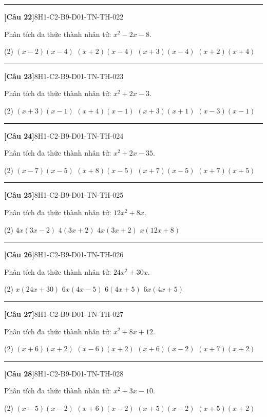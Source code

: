 \documentclass[12pt,a4paper]{article}
\newif\ifloigiai
\newenvironment{cauhoi}[2]{%
  \par\medskip\noindent\rule{\textwidth}{0.4pt}\par\nopagebreak
  \noindent\textbf{[#1]}\hfill{\scriptsize\ttfamily #2}\par\nopagebreak\smallskip}{\par}
\newcommand{\dapan}[1]{\ifloigiai\par\smallskip\noindent\textit{Đáp án:} \textbf{#1}\par\fi}
\begin{document}
\begin{cauhoi}{Câu 22}{8H1-C2-B9-D01-TN-TH-022}
Phân tích đa thức thành nhân tử: $x^{2} - 2x - 8$.
\begin{tasks}(2)
\task $(x - 2)(x - 4)$
\task $(x + 2)(x - 4)$
\task $(x + 3)(x - 4)$
\task $(x + 2)(x + 4)$
\end{tasks}
\dapan{B}
\end{cauhoi}
\begin{cauhoi}{Câu 23}{8H1-C2-B9-D01-TN-TH-023}
Phân tích đa thức thành nhân tử: $x^{2} + 2x - 3$.
\begin{tasks}(2)
\task $(x + 3)(x - 1)$
\task $(x + 4)(x - 1)$
\task $(x + 3)(x + 1)$
\task $(x - 3)(x - 1)$
\end{tasks}
\dapan{A}
\end{cauhoi}
\begin{cauhoi}{Câu 24}{8H1-C2-B9-D01-TN-TH-024}
Phân tích đa thức thành nhân tử: $x^{2} + 2x - 35$.
\begin{tasks}(2)
\task $(x - 7)(x - 5)$
\task $(x + 8)(x - 5)$
\task $(x + 7)(x - 5)$
\task $(x + 7)(x + 5)$
\end{tasks}
\dapan{C}
\end{cauhoi}
\begin{cauhoi}{Câu 25}{8H1-C2-B9-D01-TN-TH-025}
Phân tích đa thức thành nhân tử: $12x^{2} + 8x$.
\begin{tasks}(2)
\task $4x(3x - 2)$
\task $4(3x + 2)$
\task $4x(3x + 2)$
\task $x(12x + 8)$
\end{tasks}
\dapan{C}
\end{cauhoi}
\begin{cauhoi}{Câu 26}{8H1-C2-B9-D01-TN-TH-026}
Phân tích đa thức thành nhân tử: $24x^{2} + 30x$.
\begin{tasks}(2)
\task $x(24x + 30)$
\task $6x(4x - 5)$
\task $6(4x + 5)$
\task $6x(4x + 5)$
\end{tasks}
\dapan{D}
\end{cauhoi}
\begin{cauhoi}{Câu 27}{8H1-C2-B9-D01-TN-TH-027}
Phân tích đa thức thành nhân tử: $x^{2} + 8x + 12$.
\begin{tasks}(2)
\task $(x + 6)(x + 2)$
\task $(x - 6)(x + 2)$
\task $(x + 6)(x - 2)$
\task $(x + 7)(x + 2)$
\end{tasks}
\dapan{A}
\end{cauhoi}
\begin{cauhoi}{Câu 28}{8H1-C2-B9-D01-TN-TH-028}
Phân tích đa thức thành nhân tử: $x^{2} + 3x - 10$.
\begin{tasks}(2)
\task $(x - 5)(x - 2)$
\task $(x + 6)(x - 2)$
\task $(x + 5)(x - 2)$
\task $(x + 5)(x + 2)$
\end{tasks}
\dapan{C}
\end{cauhoi}
\end{document}
